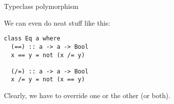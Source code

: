 %
\begin{frame}[fragile]{Typeclass polymorphism}

We can even do neat stuff like this:

\begin{block}{}
\begin{verbatim}
class Eq a where
  (==) :: a -> a -> Bool
  x == y = not (x /= y)
  
  (/=) :: a -> a -> Bool
  x /= y = not (x == y)
\end{verbatim}
\end{block}

Clearly, we have to override one or the other (or both).

\end{frame}

